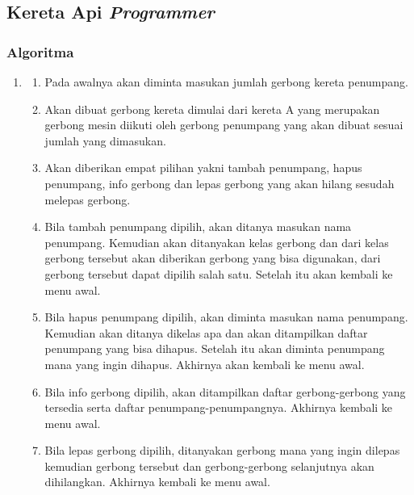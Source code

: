 \documentclass[../main.tex]{subfiles}
\begin{document}
\subsection{Kereta Api \textit{Programmer}}
\subsubsection{Algoritma}
\begin{enumerate}
    \item[]
    \begin{enumerate}
        \item {Pada awalnya akan diminta masukan jumlah gerbong kereta penumpang. }
        \item {Akan dibuat gerbong kereta dimulai dari kereta A yang merupakan gerbong mesin diikuti oleh gerbong penumpang yang akan dibuat sesuai jumlah yang dimasukan.}
        \item {Akan diberikan empat pilihan yakni tambah penumpang, hapus penumpang, info gerbong dan lepas gerbong yang akan hilang sesudah melepas gerbong.}
        \item {Bila tambah penumpang dipilih, akan ditanya masukan nama penumpang. Kemudian akan ditanyakan kelas gerbong dan dari kelas gerbong tersebut akan diberikan gerbong yang bisa digunakan, dari gerbong tersebut dapat dipilih salah satu. Setelah itu akan kembali ke menu awal.}
        \item {Bila hapus penumpang dipilih, akan diminta masukan nama penumpang. Kemudian akan ditanya dikelas apa dan akan ditampilkan daftar penumpang yang bisa dihapus. Setelah itu akan diminta penumpang mana yang ingin dihapus. Akhirnya akan kembali ke menu awal.}
        \item {Bila info gerbong dipilih, akan ditampilkan daftar gerbong-gerbong yang tersedia serta daftar penumpang-penumpangnya. Akhirnya kembali ke menu awal.}
        \item {Bila lepas gerbong dipilih, ditanyakan gerbong mana yang ingin dilepas kemudian gerbong tersebut dan gerbong-gerbong selanjutnya akan dihilangkan. Akhirnya kembali ke menu awal.}
    \end{enumerate}
\end{enumerate}

\subsubsection{\Flowchart}
\newpage
\subsubsectionf{{\Source} {\sCode}}
\vspace{-1ex}
\end{document}
